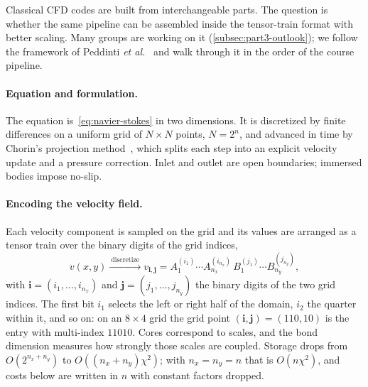 Classical CFD codes are built from interchangeable parts. The question is
whether the same pipeline can be assembled inside the tensor-train format with
better scaling. Many groups are working on it (\cref{subsec:part3-outlook}); we
follow the framework of Peddinti \emph{et al.}~\cite{Peddinti2024} and walk
through it in the order of the course pipeline.

\paragraph{Equation and formulation.}
The equation is~\eqref{eq:navier-stokes} in two dimensions. It is discretized by
finite differences on a uniform grid of $N \times N$ points, $N = 2^n$, and
advanced in time by Chorin's projection method~\cite{Chorin1968}, which splits
each step into an explicit velocity update and a pressure correction. Inlet and
outlet are open boundaries; immersed bodies impose no-slip.

\paragraph{Encoding the velocity field.}
Each velocity component is sampled on the grid and its values are arranged as a
tensor train over the binary digits of the grid indices,
\begin{equation}
  v(x,y) \xrightarrow{\ \text{discretize}\ } v_{\mathbf{i},\mathbf{j}}
    = A_1^{(i_1)} \cdots A_{n_x}^{(i_{n_x})}\,
      B_1^{(j_1)} \cdots B_{n_y}^{(j_{n_y})},
  \label{eq:stacked-encoding}
\end{equation}
with $\mathbf{i} = (i_1,\dots,i_{n_x})$ and $\mathbf{j}=(j_1,\dots,j_{n_y})$ the
binary digits of the two grid indices. The first bit $i_1$ selects the left or
right half of the domain, $i_2$ the quarter within it, and so on: on an
$8\times4$ grid the grid point $(\mathbf{i},\mathbf{j}) = (110, 10)$ is the entry
with multi-index $11010$. Cores correspond to scales, and the bond dimension
measures how strongly those scales are coupled. Storage drops from
$O(2^{n_x+n_y})$ to $O((n_x+n_y)\chi^2)$; with $n_x = n_y = n$ that is
$O(n\chi^2)$, and costs below are written in $n$ with constant factors dropped.

